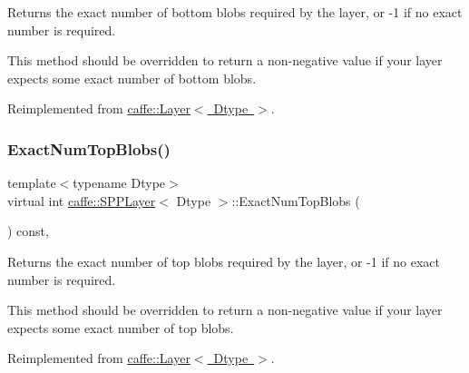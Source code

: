 Returns the exact number of bottom blobs required by the layer, or -\/1 if no exact number is required. 

This method should be overridden to return a non-\/negative value if your layer expects some exact number of bottom blobs. 

Reimplemented from \mbox{\hyperlink{classcaffe_1_1_layer_a8e5ee0494d85f5f55fc4396537cbc60f}{caffe\+::\+Layer$<$ Dtype $>$}}.

\mbox{\label{classcaffe_1_1_s_p_p_layer_a345f640e6c1d3e9ee929d706b68300e9}} 
\subsubsection{\texorpdfstring{Exact\+Num\+Top\+Blobs()}{ExactNumTopBlobs()}\hspace{0.1cm}{\footnotesize\ttfamily [1/2]}}
{\footnotesize\ttfamily template$<$typename Dtype$>$ \\
virtual int \mbox{\hyperlink{classcaffe_1_1_s_p_p_layer}{caffe\+::\+S\+P\+P\+Layer}}$<$ Dtype $>$\+::Exact\+Num\+Top\+Blobs (\begin{DoxyParamCaption}{ }\end{DoxyParamCaption}) const\hspace{0.3cm}{\ttfamily [inline]}, {\ttfamily [virtual]}}



Returns the exact number of top blobs required by the layer, or -\/1 if no exact number is required. 

This method should be overridden to return a non-\/negative value if your layer expects some exact number of top blobs. 

Reimplemented from \mbox{\hyperlink{classcaffe_1_1_layer_a64e2ca72c719e4b2f1f9216ccfb0d37f}{caffe\+::\+Layer$<$ Dtype $>$}}.

\mbox{\label{classcaffe_1_1_s_p_p_layer_a345f640e6c1d3e9ee929d706b68300e9}} 

